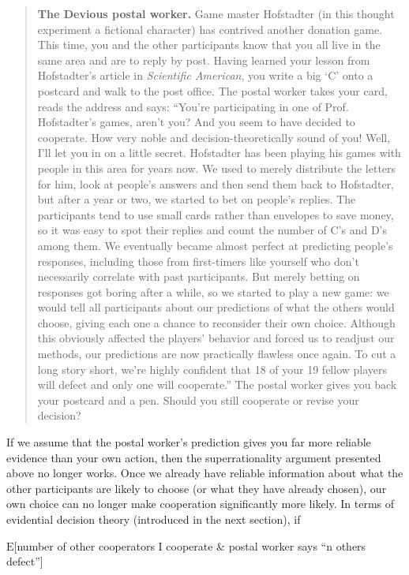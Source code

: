 \begin{quote}
\textbf{The Devious postal worker.} Game master Hofstadter (in this
thought experiment a fictional character) has contrived another donation
game. This time, you and the other participants know that you all live
in the same area and are to reply by post. Having learned your lesson
from Hofstadter's article in \emph{Scientific American}, you write a big
`C' onto a postcard and walk to the post office. The postal worker takes
your card, reads the address and says: ``You're participating in one of
Prof. Hofstadter's games, aren't you? And you seem to have decided to
cooperate. How very noble and decision-theoretically sound of you! Well,
I'll let you in on a little secret. Hofstadter has been playing his
games with people in this area for years now. We used to merely
distribute the letters for him, look at people's answers and then send
them back to Hofstadter, but after a year or two, we started to bet on
people's replies. The participants tend to use small cards rather than
envelopes to save money, so it was easy to spot their replies and count
the number of C's and D's among them. We eventually became almost
perfect at predicting people's responses, including those from
first-timers like yourself who don't necessarily correlate with past
participants. But merely betting on responses got boring after a while,
so we started to play a new game: we would tell all participants about
our predictions of what the others would choose, giving each one a
chance to reconsider their own choice. Although this obviously affected
the players' behavior and forced us to readjust our methods, our
predictions are now practically flawless once again. To cut a long story
short, we're highly confident that 18 of your 19 fellow players will
defect and only one will cooperate.'' The postal worker gives you back
your postcard and a pen. Should you still cooperate or revise your
decision?
\end{quote}

If we assume that the postal worker's prediction gives you far more
reliable evidence than your own action, then the superrationality
argument presented above no longer works. Once we already have reliable
information about what the other participants are likely to choose (or
what they have already chosen), our own choice can no longer make
cooperation significantly more likely. In terms of evidential decision
theory (introduced in the next section), if

$\mathrm{E}${[}number of other cooperators \textbar{} I cooperate \& postal worker
says ``n others defect''{]}

